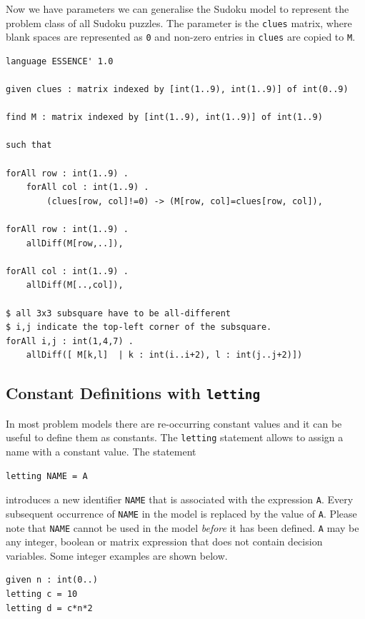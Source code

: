 \documentclass[a4paper]{article}
\begin{document}
Now we have parameters we can generalise the Sudoku model to represent the 
problem class of all Sudoku puzzles. The parameter is the \texttt{clues} 
matrix, where blank spaces are represented as \texttt{0} and non-zero entries
in \texttt{clues} are copied to \texttt{M}. 

\begin{verbatim}
language ESSENCE' 1.0

given clues : matrix indexed by [int(1..9), int(1..9)] of int(0..9)

find M : matrix indexed by [int(1..9), int(1..9)] of int(1..9)

such that

forAll row : int(1..9) .
    forAll col : int(1..9) .
        (clues[row, col]!=0) -> (M[row, col]=clues[row, col]),

forAll row : int(1..9) .
    allDiff(M[row,..]),

forAll col : int(1..9) .
    allDiff(M[..,col]),	 

$ all 3x3 subsquare have to be all-different
$ i,j indicate the top-left corner of the subsquare. 
forAll i,j : int(1,4,7) .
    allDiff([ M[k,l]  | k : int(i..i+2), l : int(j..j+2)])
\end{verbatim}


\subsection{Constant Definitions with {\tt letting}\label{sec:letting}}

In most problem models there are re-occurring constant values and
it can be useful to define them as constants. The {\tt letting}
statement allows to assign a name with a constant value. The statement

\begin{verbatim}
letting NAME = A
\end{verbatim}

introduces a new identifier {\tt NAME} that is associated with 
the expression \texttt{A}. Every subsequent occurrence of 
{\tt NAME} in the model is replaced by the value of {\tt A}. Please note 
that {\tt NAME} cannot be used in the model {\em before} it has been 
defined. \texttt{A} may be any integer, boolean or matrix expression that does
not contain decision variables. Some integer examples are shown below. 

\begin{verbatim}
given n : int(0..)
letting c = 10
letting d = c*n*2
\end{verbatim}
\end{document}
